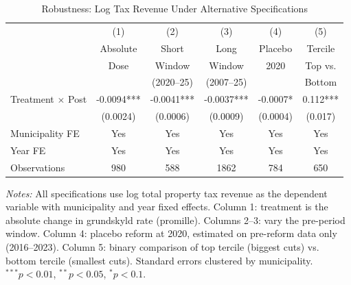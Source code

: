 \begin{table}[t]\begin{threeparttable}
\centering
\caption{Robustness: Log Tax Revenue Under Alternative Specifications}
\label{tab:robust}
\small
\begin{tabular}{lccccc}
\toprule
  & (1) & (2) & (3) & (4) & (5) \\
  & Absolute & Short & Long & Placebo & Tercile \\
  & Dose & Window & Window & 2020 & Top vs. \\
  & & (2020--25) & (2007--25) & & Bottom \\
\midrule
  Treatment $\times$ Post & -0.0094*** & -0.0041*** & -0.0037*** & -0.0007* & 0.112*** \\
  & (0.0024) & (0.0006) & (0.0009) & (0.0004) & (0.017) \\[6pt]
  Municipality FE & Yes & Yes & Yes & Yes & Yes \\
  Year FE & Yes & Yes & Yes & Yes & Yes \\
  Observations & 980 & 588 & 1862 & 784 & 650 \\
\bottomrule
\end{tabular}
\begin{tablenotes}
\item \textit{Notes:} All specifications use log total property tax revenue as the dependent variable with municipality and year fixed effects. Column 1: treatment is the absolute change in grundskyld rate (promille). Columns 2--3: vary the pre-period window. Column 4: placebo reform at 2020, estimated on pre-reform data only (2016--2023). Column 5: binary comparison of top tercile (biggest cuts) vs. bottom tercile (smallest cuts). Standard errors clustered by municipality. $^{***}p<0.01$, $^{**}p<0.05$, $^{*}p<0.1$.
\end{tablenotes}
\end{threeparttable}\end{table}
